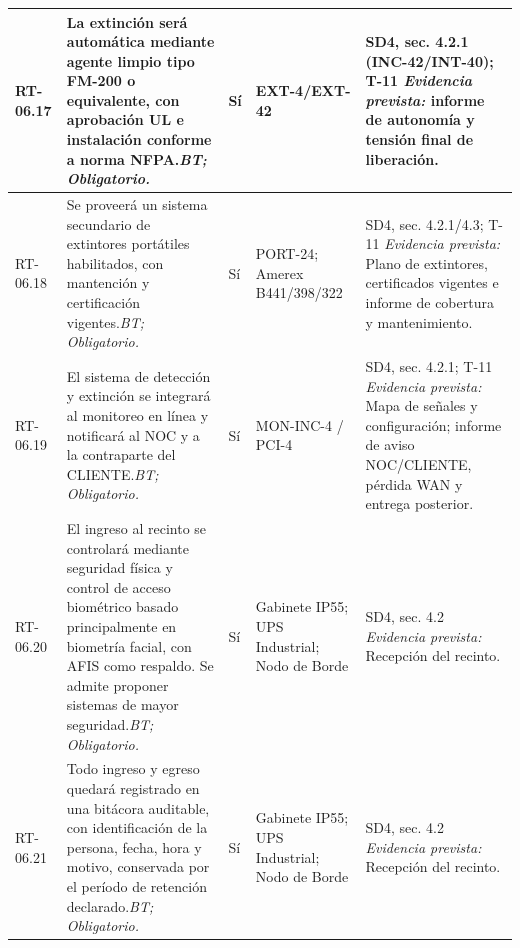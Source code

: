 \begin{paginaHorizontalSynaptix}
\begin{longtable}{|L{0.09\AnchoMatrizTDoce}|L{0.385\AnchoMatrizTDoce}|L{0.065\AnchoMatrizTDoce}|L{0.18\AnchoMatrizTDoce}|L{0.28\AnchoMatrizTDoce}|}
RT-\allowbreak{}06.\allowbreak{}17 &
La extinción será automática mediante agente limpio tipo FM-200 o equivalente, con aprobación UL e instalación conforme a norma NFPA.\newline\textit{BT; Obligatorio.} &
Sí &
EXT-4/\allowbreak{}EXT-42 &
SD4, sec. 4.2.1 (INC-42/INT-40); T-11 \newline\textit{Evidencia prevista:} informe de autonomía y tensión final de liberación. \\ \hline

RT-\allowbreak{}06.\allowbreak{}18 &
Se proveerá un sistema secundario de extintores portátiles habilitados, con mantención y certificación vigentes.\newline\textit{BT; Obligatorio.} &
Sí &
PORT-24; Amerex B441/\allowbreak{}398/\allowbreak{}322 &
SD4, sec. 4.2.1/4.3; T-11 \newline\textit{Evidencia prevista:} Plano de extintores, certificados vigentes e informe de cobertura y mantenimiento. \\ \hline

RT-\allowbreak{}06.\allowbreak{}19 &
El sistema de detección y extinción se integrará al monitoreo en línea y notificará al NOC y a la contraparte del CLIENTE.\newline\textit{BT; Obligatorio.} &
Sí &
MON-INC-4 /\allowbreak{} PCI-4 &
SD4, sec. 4.2.1; T-11 \newline\textit{Evidencia prevista:} Mapa de señales y configuración; informe de aviso NOC/CLIENTE, pérdida WAN y entrega posterior. \\ \hline

RT-\allowbreak{}06.\allowbreak{}20 &
El ingreso al recinto se controlará mediante seguridad física y control de acceso biométrico basado principalmente en biometría facial, con AFIS como respaldo. Se admite proponer sistemas de mayor seguridad.\newline\textit{BT; Obligatorio.} &
Sí &
Gabinete IP55; UPS Industrial; Nodo de Borde &
SD4, sec. 4.2 \newline\textit{Evidencia prevista:} Recepción del recinto. \\ \hline

RT-\allowbreak{}06.\allowbreak{}21 &
Todo ingreso y egreso quedará registrado en una bitácora auditable, con identificación de la persona, fecha, hora y motivo, conservada por el período de retención declarado.\newline\textit{BT; Obligatorio.} &
Sí &
Gabinete IP55; UPS Industrial; Nodo de Borde &
SD4, sec. 4.2 \newline\textit{Evidencia prevista:} Recepción del recinto. \\ \hline


\end{longtable}
\end{paginaHorizontalSynaptix}
